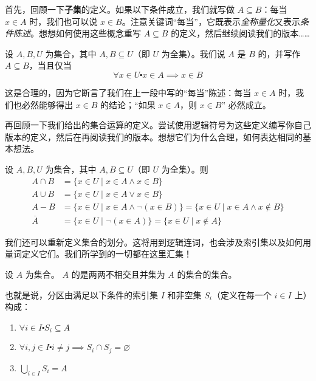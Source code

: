 首先，回顾一下\textbf{子集}的定义。如果以下条件成立，我们就写做 $A \subseteq B$：每当 $x \in A$ 时，我们也可以说 $x \in B$。注意关键词``每当''，它既表示\emph{全称量化}又表示\emph{条件陈述}。想想如何使用这些概念重写 $A \subseteq B$ 的定义，然后继续阅读我们的版本……

\begin{definition}
    设 $A, B, U$ 为集合，其中 $A, B \subseteq U$（即 $U$ 为全集）。我们说 $A$ 是 $B$ 的，并写作 $A \subseteq B$，当且仅当
    \[\forall x \in U \centerdot x \in A \implies x \in B \]
\end{definition}

这是合理的，因为它断言了我们在上一段中写的``每当''陈述：每当 $x \in A$ 时，我们也必然能够得出 $x \in B$ 的结论；``如果 $x \in A$，则 $x \in B$'' 必然成立。

再回顾一下我们给出的集合运算的定义。尝试使用逻辑符号为这些定义编写你自己版本的定义，然后在再阅读我们的版本。想想它们为什么合理，如何表达相同的基本想法。

\begin{definition}
    设 $A, B, U$ 为集合，其中 $A, B \subseteq U$（即 $U$ 为全集）。则
    \begin{align*}
        A \cap B &= \{x \in U \mid x \in A \land x \in B\} \\
        A \cup B &= \{x \in U \mid x \in A \lor x \in B\} \\
        A - B &= \{x \in U \mid x \in A \land \neg (x \in B)\} = \{x\in U \mid x \in A \land x \notin B\} \\
        \overline{A} &= \{x \in U \mid \neg (x \in A)\} = \{x \in U \mid x \notin A\}
    \end{align*}
\end{definition}

我们还可以重新定义集合的划分。这将用到逻辑连词，也会涉及索引集以及如何用量词定义它们。我们所学到的一切都在这里汇集！

\begin{definition}
    设 $A$ 为集合。 $A$ 的是两两不相交且并集为 $A$ 的集合的集合。

    也就是说，分区由满足以下条件的索引集 $I$ 和非空集 $S_i$（定义在每一个 $i \in I$ 上）构成：
    \begin{enumerate}[label=(\arabic*)]
        \item $\forall i \in I \centerdot S_i \subseteq A$
        \item $\forall i, j \in I \centerdot i \ne j \implies S_i \cap S_j = \varnothing$
        \item $\displaystyle{\bigcup_{i \in I} S_i = A}$
    \end{enumerate}
\end{definition}

